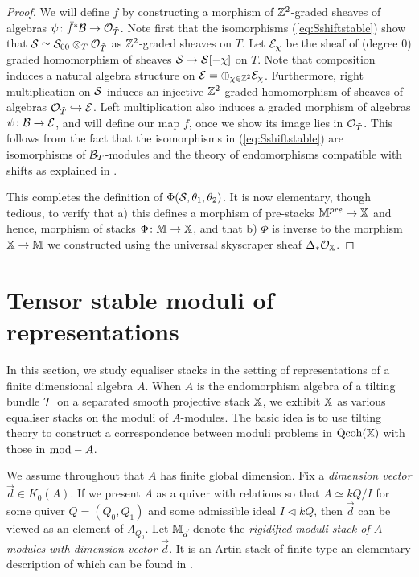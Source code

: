\documentclass[12pt]{amsart}
\begin{document}
\begin{proof}
We will define $f$ by constructing a morphism of $\mathbb{Z}^2$-graded sheaves of algebras $\psi \colon \bar{f}^* \mathcal{B} \to \mathcal{O}_{\tilde{T}}$. Note first that the isomorphisms (\ref{eq:Sshiftstable}) show that 
$\mathcal{S} \simeq \mathcal{S}_{00} \otimes_T \mathcal{O}_{\tilde{T}}$ as $\mathbb{Z}^2$-graded sheaves on $T$. Let $\mathcal{E}_{\chi}$ be the sheaf of (degree 0) graded homomorphism of sheaves $\mathcal{S} \to \mathcal{S}[-\chi]$ on $T$. Note that composition induces a natural algebra structure on $\mathcal{E} =  \oplus_{\chi \in \mathbb{Z}^2} \mathcal{E}_{\chi}$. Furthermore, right multiplication on $\mathcal{S}$ induces an injective  $\mathbb{Z}^2$-graded homomorphism of sheaves of algebras $\mathcal{O}_{\tilde{T}} \hookrightarrow \mathcal{E}$. Left multiplication also induces a graded morphism of algebras $\psi \colon \mathcal{B} \to \mathcal{E}$, and will define our map $f$, once we show its image lies in $\mathcal{O}_{\tilde{T}}$. This follows from the fact that the isomorphisms in (\ref{eq:Sshiftstable}) are isomorphisms of $\mathcal{B}_T$-modules and the theory of endomorphisms compatible with shifts as explained in \cite[Section~3]{C12}. 

This completes the definition of $\Phi(\mathcal{S}, \theta_1,\theta_2)$. It is now elementary, though tedious, to verify that a) this defines a morphism of pre-stacks $\mathbb{M}^{pre} \to \mathbb{X}$ and hence, morphism of stacks $\Phi \colon \mathbb{M} \to \mathbb{X}$, and that b) $\Phi$ is inverse to the morphism $\mathbb{X} \to \mathbb{M}$ we constructed using the universal skyscraper sheaf $\Delta_* \mathcal{O}_{\mathbb{X}}$. 
\end{proof}

\section{Tensor stable moduli of representations}\label{sc:tensor_stable}

In this section, we study equaliser stacks in the setting of representations of a finite dimensional algebra $A$. When $A$ is the endomorphism algebra of a tilting bundle $\mathcal{T}$ on a separated smooth projective stack $\mathbb{X}$, we exhibit $\mathbb{X}$ as various equaliser stacks on the moduli of $A$-modules. The basic idea is to use tilting theory to construct a correspondence between moduli problems in $\operatorname{Qcoh}(\mathbb{X})$ with those in $\textup{mod}-A$.

We assume throughout that $A$ has finite global dimension. Fix a {\em dimension vector} $\vec{d} \in K_0(A)$. If we present $A$ as a quiver with relations so that $A \simeq kQ/I$ for some quiver $Q = (Q_0,Q_1)$ and some admissible ideal $I\triangleleft kQ$, then $\vec{d}$ can be viewed as an element of $\Lambda_{Q_0}$. Let $\mathbb{M}_{\vec{d}}$ denote the {\em rigidified moduli stack of $A$-modules with dimension vector $\vec{d}$}. It is an Artin stack of finite type an elementary description of which can be found in \cite[Section~2]{CL}.
\end{document}
